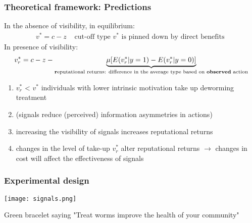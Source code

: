 \documentclass{beamer}
\theoremstyle{plain}
\renewcommand{\bf}{\textbf}
\begin{document}
\begin{frame}[label=slide9]
\frametitle{\large{Theoretical framework: Predictions}}
\small{In the absence of visibility, in equilibrium: 
\begin{align}
 v^{*} = c - z &  \text{ \ \ cut-off type $v^{*}$ is pinned down by direct benefits \ \ }  \nonumber  
\end{align}}
\small{In presence of visibility: %
\begin{align}
 v_r^{*} = c - z - \underbrace{\mu[E(v_r^{*}| y = 1) - E(v_r^{*}|y = 0)]}_{\text{\bf{r}\rm eputational returns: difference in the average type based on \bf{observed} \rm action}}   \nonumber 
\end{align}}
\begin{enumerate}
\item $v_r^{*}$ < $v^{*}$ individuals with lower intrinsic motivation take up deworming treatment
\item (signals reduce (perceived) information asymmetries in actions) %
\item increasing the visibility of signals increases reputational returns 
\item changes in the level of take-up $v_r^{*}$ alter reputational returns $\rightarrow$ changes in cost will affect the effectiveness of signals %
\end{enumerate}
\end{frame}

\begin{frame}[label=slide10]
\frametitle{\large{Experimental design}}
\begin{center}
\texttt{[image: signals.png]}
\end{center}
Green bracelet saying "Treat worms improve the health of your community"
\end{frame}
\end{document}
